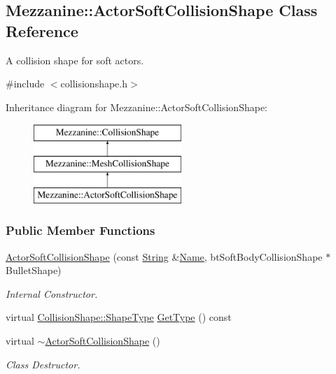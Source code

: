 \hypertarget{classMezzanine_1_1ActorSoftCollisionShape}{
\subsection{Mezzanine::ActorSoftCollisionShape Class Reference}
\label{classMezzanine_1_1ActorSoftCollisionShape}
}


A collision shape for soft actors.  




{\ttfamily \#include $<$collisionshape.h$>$}

Inheritance diagram for Mezzanine::ActorSoftCollisionShape:\begin{figure}[H]
\begin{center}
\leavevmode
\includegraphics[height=3.000000cm]{classMezzanine_1_1ActorSoftCollisionShape}
\end{center}
\end{figure}
\subsubsection*{Public Member Functions}
\begin{DoxyCompactItemize}
\item 
\hyperlink{classMezzanine_1_1ActorSoftCollisionShape_abf4ea33ed056afcac18a41366fedccc1}{ActorSoftCollisionShape} (const \hyperlink{namespaceMezzanine_acf9fcc130e6ebf08e3d8491aebcf1c86}{String} \&\hyperlink{classMezzanine_1_1CollisionShape_aac524c5c56fa4d158bc071f8aecfbe79}{Name}, btSoftBodyCollisionShape $\ast$BulletShape)
\begin{DoxyCompactList}\small\item\em Internal Constructor. \item\end{DoxyCompactList}\item 
virtual \hyperlink{classMezzanine_1_1CollisionShape_ad04186055565998879b64176d6dd100d}{CollisionShape::ShapeType} \hyperlink{classMezzanine_1_1ActorSoftCollisionShape_ae9ac8413434ff0de10376deb64ab49d0}{GetType} () const 
\item 
\hypertarget{classMezzanine_1_1ActorSoftCollisionShape_aba997fd9f65ace81db3779a952eba27e}{
virtual \hyperlink{classMezzanine_1_1ActorSoftCollisionShape_aba997fd9f65ace81db3779a952eba27e}{$\sim$ActorSoftCollisionShape} ()}
\label{classMezzanine_1_1ActorSoftCollisionShape_aba997fd9f65ace81db3779a952eba27e}

\begin{DoxyCompactList}\small\item\em Class Destructor. \item\end{DoxyCompactList}\end{DoxyCompactItemize}
